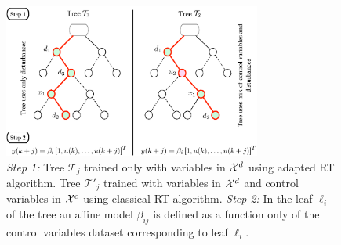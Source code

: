 \begin{figure}[t!]

	\centering

	\includegraphics[width=20pc]{figures/dpc-sepvars.eps}

	\caption{\textit{Step 1:} Tree $\mathcal{T}_j$ trained only with variables in $\mathcal{X}^d$ using adapted RT algorithm. Tree $\mathcal{T}'_j$ trained with variables in $\mathcal{X}^d$ and control variables in $\mathcal{X}^c$ using classical RT algorithm. \textit{Step 2:} In the leaf $\ell_i$ of the tree an affine model $\beta_{ij}$ is defined as a function only of the control variables dataset corresponding to leaf $\ell_i$.}

	\captionsetup{justification=centering}

	\label{F:dpc-sepvars}

\end{figure}


